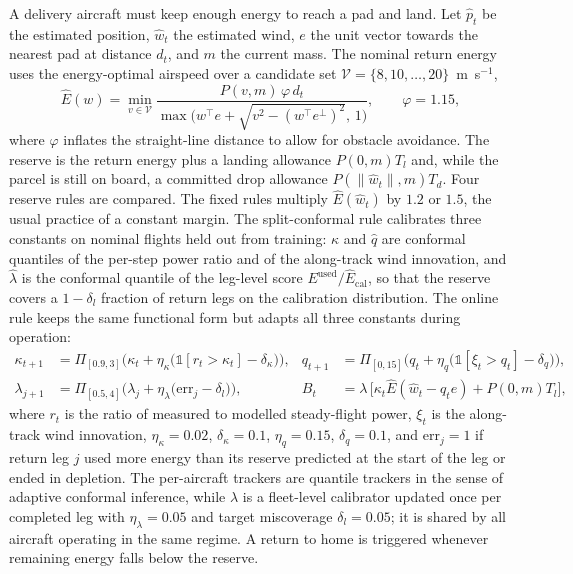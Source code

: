 A delivery aircraft must keep enough energy to reach a pad and land. Let $\hat p_t$ be the estimated position, $\hat w_t$ the estimated wind, $e$ the unit vector towards the nearest pad at distance $d_t$, and $m$ the current mass. The nominal return energy uses the energy-optimal airspeed over a candidate set $\mathcal{V}=\{8,10,\dots,20\}$~m~s$^{-1}$,
\begin{equation}
\hat E(w) = \min_{v\in\mathcal{V}} \frac{P(v,m)\,\varphi\, d_t}{\max\!\big(w^\top e + \sqrt{v^2-(w^\top e^\perp)^2},\,1\big)} , \qquad \varphi = 1.15,
\label{eq:enom}
\end{equation}
where $\varphi$ inflates the straight-line distance to allow for obstacle avoidance. The reserve is the return energy plus a landing allowance $P(0,m)T_l$ and, while the parcel is still on board, a committed drop allowance $P(\lVert\hat w_t\rVert,m)T_d$. Four reserve rules are compared. The fixed rules multiply $\hat E(\hat w_t)$ by $1.2$ or $1.5$, the usual practice of a constant margin. The split-conformal rule calibrates three constants on nominal flights held out from training: $\hat\kappa$ and $\hat q$ are conformal quantiles of the per-step power ratio and of the along-track wind innovation, and $\hat\lambda$ is the conformal quantile of the leg-level score $E^{\mathrm{used}}/\hat E_{\mathrm{cal}}$, so that the reserve covers a $1-\delta_l$ fraction of return legs on the calibration distribution\cite{vovk2005algorithmic,angelopoulos2023gentle}. The online rule keeps the same functional form but adapts all three constants during operation:
\begin{align}
\kappa_{t+1} &= \Pi_{[0.9,3]}\Big(\kappa_t+\eta_\kappa\big(\mathbb{1}[r_t>\kappa_t]-\delta_\kappa\big)\Big), &
q_{t+1} &= \Pi_{[0,15]}\Big(q_t+\eta_q\big(\mathbb{1}[\xi_t>q_t]-\delta_q\big)\Big), \label{eq:trackers}\\
\lambda_{j+1} &= \Pi_{[0.5,4]}\Big(\lambda_j+\eta_\lambda\big(\mathrm{err}_j-\delta_l\big)\Big), &
B_t &= \lambda\,\Big[\kappa_t \hat E(\hat w_t - q_t e) + P(0,m)T_l\Big], \label{eq:legcal}
\end{align}
where $r_t$ is the ratio of measured to modelled steady-flight power, $\xi_t$ is the along-track wind innovation, $\eta_\kappa=0.02$, $\delta_\kappa=0.1$, $\eta_q=0.15$, $\delta_q=0.1$, and $\mathrm{err}_j=1$ if return leg $j$ used more energy than its reserve predicted at the start of the leg or ended in depletion. The per-aircraft trackers are quantile trackers in the sense of adaptive conformal inference\cite{gibbs2021aci,angelopoulos2023pid}, while $\lambda$ is a fleet-level calibrator updated once per completed leg with $\eta_\lambda=0.05$ and target miscoverage $\delta_l=0.05$; it is shared by all aircraft operating in the same regime. A return to home is triggered whenever remaining energy falls below the reserve.

